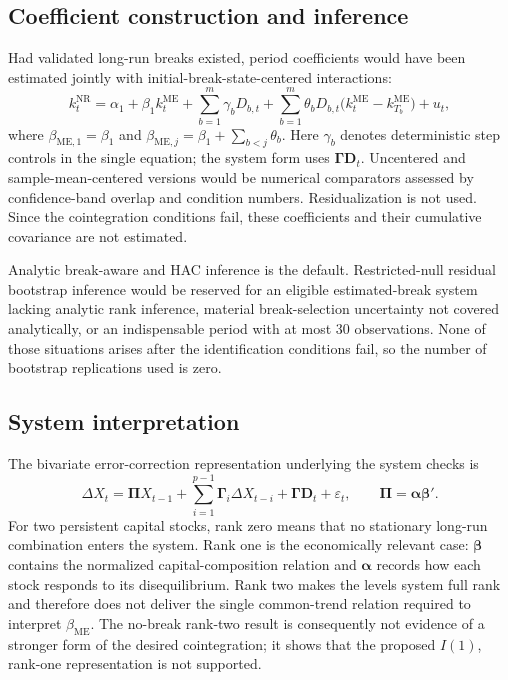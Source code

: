 \documentclass[11pt,a4paper]{article}
\begin{document}
\subsection{Coefficient construction and inference}

Had validated long-run breaks existed, period coefficients would have been
estimated jointly with initial-break-state-centered interactions:
\begin{equation}
k_t^{\mathrm{NR}}=\alpha_1+\beta_1 k_t^{\mathrm{ME}}
+\sum_{b=1}^{m}\gamma_bD_{b,t}
+\sum_{b=1}^{m}\theta_bD_{b,t}
  \bigl(k_t^{\mathrm{ME}}-k_{T_b}^{\mathrm{ME}}\bigr)+u_t ,
\end{equation}
where \(\beta_{\mathrm{ME},1}=\beta_1\) and
\(\beta_{\mathrm{ME},j}=\beta_1+\sum_{b<j}\theta_b\).
Here \(\gamma_b\) denotes deterministic step controls in the single equation;
the system form uses \(\boldsymbol{\Gamma}\mathbf D_t\).
Uncentered and sample-mean-centered versions would be numerical
comparators assessed by confidence-band overlap and condition numbers.
Residualization is not used. Since the cointegration conditions fail, these
coefficients and their cumulative covariance are not estimated.

Analytic break-aware and HAC inference is the default. Restricted-null
residual bootstrap inference would be reserved for an eligible
estimated-break system lacking analytic rank inference, material
break-selection uncertainty not covered analytically, or an indispensable
period with at most 30 observations. None of those situations arises after
the identification conditions fail, so the number of bootstrap replications
used is zero.

\subsection{System interpretation}

The bivariate error-correction representation underlying the system checks is
\begin{equation}
\Delta X_t=\boldsymbol{\Pi}X_{t-1}
+\sum_{i=1}^{p-1}\boldsymbol{\Gamma}_i\Delta X_{t-i}
+\boldsymbol{\Gamma}\mathbf D_t+\varepsilon_t,
\qquad
\boldsymbol{\Pi}=\boldsymbol{\alpha}\boldsymbol{\beta}' .
\end{equation}
For two persistent capital stocks, rank zero means that no stationary
long-run combination enters the system. Rank one is the economically relevant
case: \(\boldsymbol{\beta}\) contains the normalized capital-composition
relation and \(\boldsymbol{\alpha}\) records how each stock responds to its
disequilibrium. Rank two makes the levels system full rank and therefore does
not deliver the single common-trend relation required to interpret
\(\beta_{\mathrm{ME}}\). The no-break rank-two result is consequently not
evidence of a stronger form of the desired cointegration; it shows that the
proposed \(I(1)\), rank-one representation is not supported.
\end{document}
